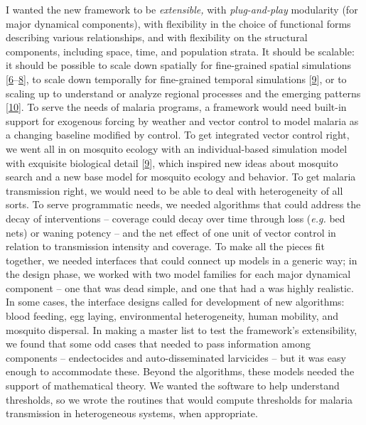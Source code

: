 \documentclass[
]{book}
\begin{document}
I wanted the new framework to be \emph{extensible,} with \emph{plug-and-play} modularity (for major dynamical components), with flexibility in the choice of functional forms describing various relationships, and with flexibility on the structural components, including space, time, and population strata.
It should be scalable: it should be possible to scale down spatially for fine-grained spatial simulations {[}\protect\hyperlink{ref-CarterR2002SpatialSimulation}{6}--\protect\hyperlink{ref-PerkinsTA2013HeterogeneityMixing}{8}{]}, to scale down temporally for fine-grained temporal simulations {[}\protect\hyperlink{ref-WuSL2020MBITES}{9}{]}, or to scaling up to understand or analyze regional processes and the emerging patterns {[}\protect\hyperlink{ref-TatemAJ2010InternationalPopulation}{10}{]}.
To serve the needs of malaria programs, a framework would need built-in support for exogenous forcing by weather and vector control to model malaria as a changing baseline modified by control.
To get integrated vector control right, we went all in on mosquito ecology with an individual-based simulation model with exquisite biological detail {[}\protect\hyperlink{ref-WuSL2020MBITES}{9}{]}, which inspired new ideas about mosquito search and a new base model for mosquito ecology and behavior.
To get malaria transmission right, we would need to be able to deal with heterogeneity of all sorts.
To serve programmatic needs, we needed algorithms that could address the decay of interventions
-- coverage could decay over time through loss (\emph{e.g.} bed nets) or waning potency --
and the net effect of one unit of vector control in relation to transmission intensity and coverage.
To make all the pieces fit together, we needed interfaces that could connect up models in a generic way; in the design phase, we worked with two model families for each major dynamical component -- one that was dead simple, and one that had a was highly realistic.
In some cases, the interface designs called for development of new algorithms: blood feeding, egg laying, environmental heterogeneity, human mobility, and mosquito dispersal.
In making a master list to test the framework's extensibility, we found that some odd cases that needed to pass information among components -- endectocides and auto-disseminated larvicides -- but it was easy enough to accommodate these.
Beyond the algorithms, these models needed the support of mathematical theory.
We wanted the software to help understand thresholds, so we wrote the routines that would compute thresholds for malaria transmission in heterogeneous systems, when appropriate.
\end{document}
